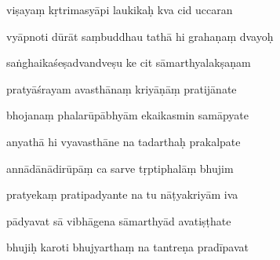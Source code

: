 \documentclass[article,12pt,a4paper]{memoir}%
\newcounter{parCount}
\begin{document}
	  
	  \pstart {} viṣayaṃ kṛtrimasyāpi laukikaḥ kva cid uccaran 
	{}
	\pend%
      

	  
	  \pstart \leavevmode%
	vyāpnoti dūrāt saṃbuddhau tathā hi grahaṇaṃ dvayoḥ 
	{}
	\pend%
      

	  
	  \pstart {} saṅghaikaśeṣadvandveṣu ke cit sāmarthyalakṣaṇam 
	{}
	\pend%
      

	  
	  \pstart \leavevmode%
	pratyāśrayam avasthānaṃ kriyāṇāṃ pratijānate 
	{}
	\pend%
      

	  
	  \pstart {} bhojanaṃ phalarūpābhyām ekaikasmin samāpyate 
	{}
	\pend%
      

	  
	  \pstart \leavevmode%
	anyathā hi vyavasthāne na tadarthaḥ prakalpate 
	{}
	\pend%
      

	  
	  \pstart {} annādānādirūpāṃ ca sarve tṛptiphalāṃ bhujim 
	{}
	\pend%
      

	  
	  \pstart \leavevmode%
	pratyekaṃ pratipadyante na tu nāṭyakriyām iva 
	{}
	\pend%
      

	  
	  \pstart {} pādyavat sā vibhāgena sāmarthyād avatiṣṭhate 
	{}
	\pend%
      

	  
	  \pstart \leavevmode%
	bhujiḥ karoti bhujyarthaṃ na tantreṇa pradīpavat 
	{}
	\pend%
      
\end{document}
